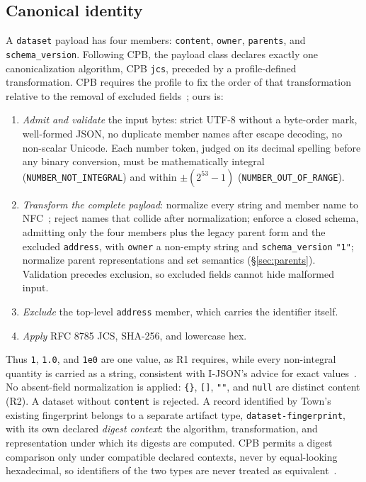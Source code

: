 \documentclass[conference]{IEEEtran}
\begin{document}
\subsection{Canonical identity}\label{sec:canon}
A \texttt{dataset} payload has four members: \texttt{content}, \texttt{owner}, \texttt{parents}, and \texttt{schema\_version}. Following CPB, the payload class declares exactly one canonicalization algorithm, CPB \texttt{jcs}, preceded by a profile-defined transformation. CPB requires the profile to fix the order of that transformation relative to the removal of excluded fields~\cite{cpb03}; ours is:
\begin{enumerate}
\item \emph{Admit and validate} the input bytes: strict UTF-8 without a byte-order mark, well-formed JSON, no duplicate member names after escape decoding, no non-scalar Unicode. Each number token, judged on its decimal spelling before any binary conversion, must be mathematically integral (\texttt{NUMBER\_NOT\_INTEGRAL}) and within $\pm(2^{53}-1)$ (\texttt{NUMBER\_OUT\_OF\_RANGE}).
\item \emph{Transform the complete payload}: normalize every string and member name to NFC~\cite{uax15}; reject names that collide after normalization; enforce a closed schema, admitting only the four members plus the legacy parent form and the excluded \texttt{address}, with \texttt{owner} a non-empty string and \texttt{schema\_version} \texttt{"1"}; normalize parent representations and set semantics (\S\ref{sec:parents}). Validation precedes exclusion, so excluded fields cannot hide malformed input.
\item \emph{Exclude} the top-level \texttt{address} member, which carries the identifier itself.
\item \emph{Apply} RFC 8785 JCS, SHA-256, and lowercase hex.
\end{enumerate}
Thus \texttt{1}, \texttt{1.0}, and \texttt{1e0} are one value, as R1 requires, while every non-integral quantity is carried as a string, consistent with I-JSON's advice for exact values~\cite{rfc7493}. No absent-field normalization is applied: \texttt{\{\}}, \texttt{[]}, \texttt{""}, and \texttt{null} are distinct content (R2). A dataset without \texttt{content} is rejected. A record identified by Town's existing fingerprint belongs to a separate artifact type, \texttt{dataset-fingerprint}, with its own declared \emph{digest context}: the algorithm, transformation, and representation under which its digests are computed. CPB permits a digest comparison only under compatible declared contexts, never by equal-looking hexadecimal, so identifiers of the two types are never treated as equivalent~\cite{cpb03}.
\end{document}
